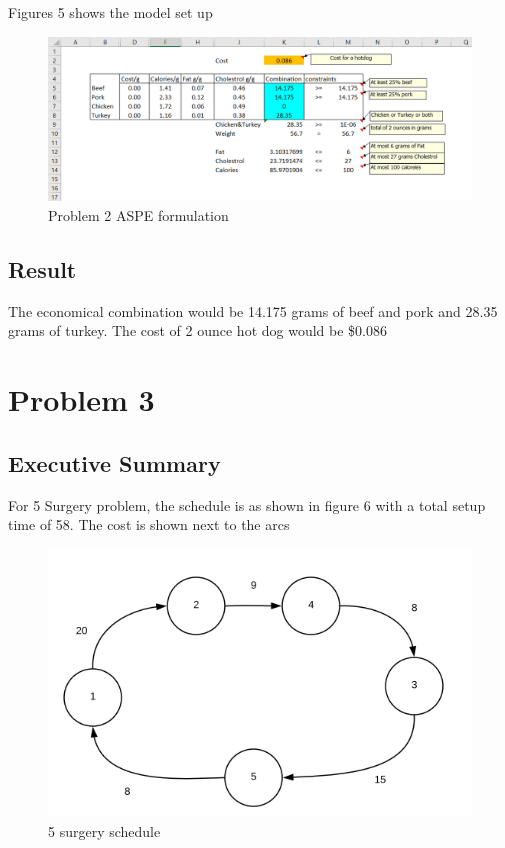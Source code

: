 \documentclass[]{article}
\begin{document}
Figures 5 shows the model set up

\begin{figure}
\centering
\includegraphics[height=0.50000\textwidth]{Figures/Homework3/p2.PNG}
\caption{Problem 2 ASPE formulation}
\end{figure}

\subsection{Result}\label{result}

The economical combination would be 14.175 grams of beef and pork and
28.35 grams of turkey. The cost of 2 ounce hot dog would be \$0.086

\section{Problem 3}\label{problem-3}

\subsection{Executive Summary}\label{executive-summary-2}

For 5 Surgery problem, the schedule is as shown in figure 6 with a total
setup time of 58. The cost is shown next to the arcs

\begin{figure}[h]

{\centering \includegraphics[width=7.69in]{Figures/Homework3/p3aS} 

}

\caption{5 surgery schedule}\label{fig:unnamed-chunk-6}
\end{figure}
\end{document}
